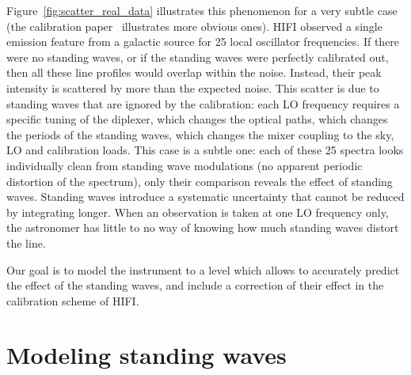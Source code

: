 \documentclass[a4paper,11pt]{article}
\begin{document}
Figure~\ref{fig:scatter_real_data} illustrates this phenomenon for a very subtle case
(the calibration paper~\cite{AA_537_A17} illustrates more obvious ones).
HIFI observed a single emission feature from a galactic source for 25 local oscillator frequencies.
If there were no standing waves, or if the standing waves were perfectly calibrated out, then all these line profiles would overlap within the noise.
Instead, their peak intensity is scattered by more than the expected noise.
This scatter is due to standing waves that are ignored by the calibration: each LO frequency requires a specific tuning of the diplexer, which changes the optical paths, which changes the periods of the standing waves, which changes the mixer coupling to the sky, LO and calibration loads.
This case is a subtle one: each of these 25 spectra looks individually clean from standing wave modulations (no apparent periodic distortion of the spectrum), only their comparison reveals the effect of standing waves.
Standing waves introduce a systematic uncertainty that cannot be reduced by integrating longer.
When an observation is taken at one LO frequency only, the astronomer has little to no way of knowing how much standing waves distort the line.

Our goal is to model the instrument to a level which allows to accurately predict the effect of the standing waves, and include a correction of their effect in the calibration scheme of HIFI.






\section{Modeling standing waves}



\end{document}
